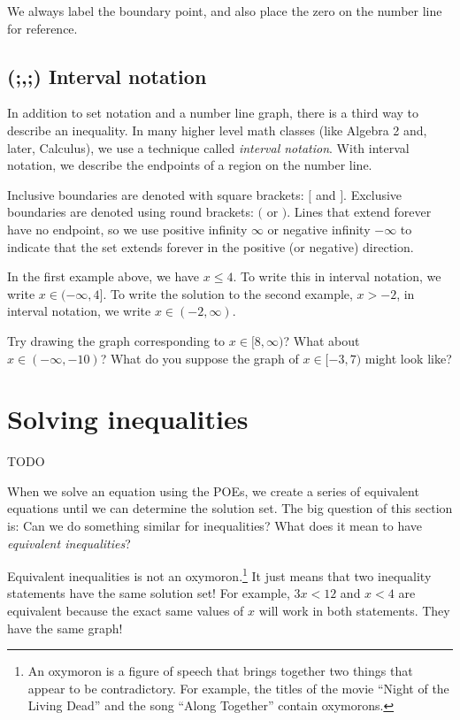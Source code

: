 We always label the boundary point, and also place the zero on the number line for reference.

\subsection{(;,;) Interval notation}

In addition to set notation and a number line graph, there is a third way to describe an inequality. In many higher level math classes (like Algebra 2 and, later, Calculus), we use a technique called \textit{interval notation}. With interval notation, we describe the endpoints of a region on the number line.

Inclusive boundaries are denoted with square brackets: $[$ and $]$.  Exclusive boundaries are denoted using round brackets: $($ or $)$. Lines that extend forever have no endpoint, so we use positive infinity $\infty$ or negative infinity $-\infty$ to indicate that the set extends forever in the positive (or negative) direction.

In the first example above, we have $x \leq 4$. To write this in interval notation, we write $x \in (-\infty, 4]$. To write the solution to the second example, $x>-2$, in interval notation, we write $x \in (-2, \infty)$.

Try drawing the graph corresponding to $x \in [8, \infty)$? What about $x \in (-\infty, -10)$? What do you suppose the graph of $x \in [-3, 7)$ might look like?

\section{Solving inequalities}
\label{sec:ineqsolving}

\begin{boxedexplore}
TODO
\end{boxedexplore}


When we solve an equation using the POEs, we create a series of equivalent equations until we can determine the solution set. The big question of this section is: Can we do something similar for inequalities? What does it mean to have \textit{equivalent inequalities}?

Equivalent inequalities is not an oxymoron.\footnote{An oxymoron is a figure of speech that brings together two things that appear to be contradictory. For example, the titles of the movie ``Night of the Living Dead'' and the song ``Along Together'' contain oxymorons.} It just means that two inequality statements have the same solution set! For example, $3x < 12$ and $x < 4$ are equivalent because the exact same values of $x$ will work in both statements. They have the same graph!

